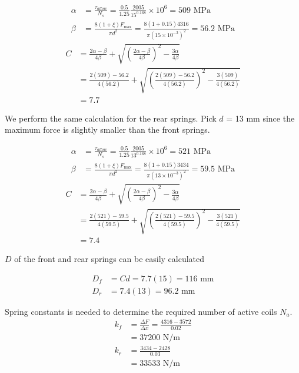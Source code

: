\documentclass[a4paper,openany,12pt]{book}
\begin{document}
{{$$\begin{aligned}
    \alpha &= \frac{\tau_{allow}}{N_s} = \frac{0.5}{1.25}\frac{2005}{15^{0.168}} \times 10^6 = 509 \text{ MPa} \\ 
    \beta &= \frac{8(1 + \xi)F_{\max}}{\pi d^2} = \frac{8(1 + 0.15)4316}{\pi (15 \times 10^{-3})^2} = 56.2 \text{ MPa}
  \end{aligned}$$ $$\begin{aligned}
    C &= \frac{2\alpha  - \beta}{4\beta} + \sqrt {\left( \frac{2\alpha  - \beta}{4\beta} \right)^2 - \frac{3\alpha}{4\beta}}  \\ 
      & = \frac{2(509) - 56.2}{4(56.2)} + \sqrt {\left( \frac{2(509) - 56.2}{4(56.2)} \right)^2 - \frac{3(509)}{4(56.2)}}  \\ 
      &= 7.7 
  \end{aligned}$$

We perform the same calculation for the rear springs. Pick \(d\) = 13 mm
since the maximum force is slightly smaller than the front springs.

$$\begin{aligned}
     \alpha &= \frac{\tau_{allow}}{N_s} = \frac{0.5}{1.25}\frac{2005}{13^{0.168}} \times 10^6 = 521 \text{ MPa} \\ 
    \beta &= \frac{8(1 + \xi)F_{\max}}{\pi d^2} = \frac{8(1 + 0.15)3434}{\pi (13 \times 10^{-3})^2} = 59.5 \text{ MPa}
  \end{aligned}$$ $$\begin{aligned}
    C &= \frac{2\alpha  - \beta}{4\beta} + \sqrt {\left( \frac{2\alpha  - \beta}{4\beta} \right)^2 - \frac{3\alpha}{4\beta}}  \\ 
      & = \frac{2(521) - 59.5}{4(59.5)} + \sqrt {\left( \frac{2(521) - 59.5}{4(59.5)} \right)^2 - \frac{3(521)}{4(59.5)}}  \\ 
      &= 7.4 
  \end{aligned}$$

\(D\) of the front and rear springs can be easily calculated

$$\begin{aligned}
    D_f &= Cd = 7.7(15) = 116 \text{ mm} \\
    D_r &= 7.4(13) = 96.2 \text{ mm}
  \end{aligned}$$

Spring constants is needed to determine the required number of active
coils \(N_a\). $$\begin{aligned}
    k_f &= \frac{\Delta F}{\Delta x} = \frac{4316 - 3572}{0.02} \\
        &= 37200 \text{ N/m} \\
    k_r &= \frac{3434 - 2428}{0.03} \\
        &= 33533 \text{ N/m}
  \end{aligned}$$

}}
\end{document}
